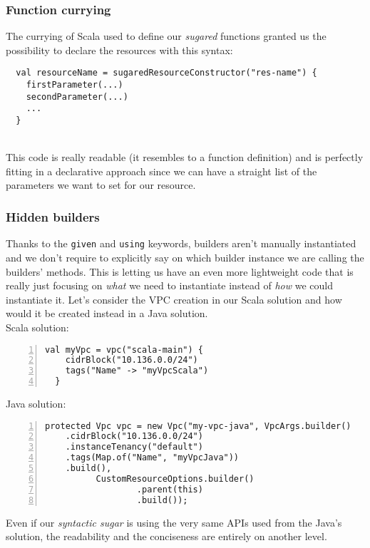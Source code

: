 \subsubsection{Function currying}
The currying of Scala used to define our \textit{sugared} functions granted us the possibility to declare the resources with this syntax:
\begin{verbatim}
  val resourceName = sugaredResourceConstructor("res-name") {
    firstParameter(...)
    secondParameter(...)
    ...
  }
\end{verbatim}\mbox{}\\
This code is really readable (it resembles to a function definition) and is perfectly fitting in a declarative approach since we can have a straight list of the parameters we want to set for our resource.\\

\subsubsection{Hidden builders}
Thanks to the \texttt{given} and \texttt{using} keywords, builders aren't manually instantiated and we don't require to explicitly say on which builder instance we are calling the builders' methods.
This is letting us have an even more lightweight code that is really just focusing on \textit{what} we need to instantiate instead of \textit{how} we could instantiate it.
Let's consider the VPC creation in our Scala solution and how would it be created instead in a Java solution.\\
Scala solution:\\
\begin{minipage}{\linewidth}
\begin{lstlisting}[numbers=left, numberstyle=\tiny, numbersep=-5pt, stepnumber=1]
  val myVpc = vpc("scala-main") {
    cidrBlock("10.136.0.0/24")
    tags("Name" -> "myVpcScala")
  }
\end{lstlisting}
\end{minipage}
Java solution:\\
\begin{minipage}{\linewidth}
\begin{lstlisting}[numbers=left, numberstyle=\tiny, numbersep=-5pt, stepnumber=1]
  protected Vpc vpc = new Vpc("my-vpc-java", VpcArgs.builder()
    .cidrBlock("10.136.0.0/24")
    .instanceTenancy("default")
    .tags(Map.of("Name", "myVpcJava"))
    .build(),
          CustomResourceOptions.builder()
                  .parent(this)
                  .build());
\end{lstlisting}
\end{minipage}
Even if our \textit{syntactic sugar} is using the very same APIs used from the Java's solution, the readability and the conciseness are entirely on another level.

